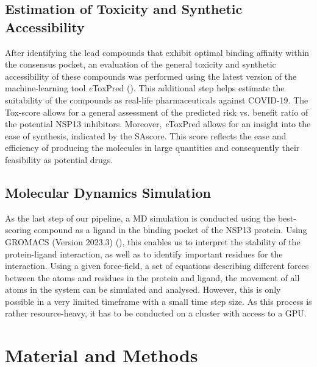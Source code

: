 \documentclass[11pt, letterpaper, titlepage]{article}
\begin{document}
\subsection{Estimation of Toxicity and Synthetic Accessibility}
 After identifying the lead compounds that exhibit optimal binding affinity within the consensus pocket, an evaluation of the general toxicity and synthetic accessibility of these compounds was performed using the latest version of the machine-learning tool \textit{e}ToxPred (\cite{pu2019toxpred}). This additional step helps estimate the suitability of the compounds as real-life pharmaceuticals against COVID-19. The Tox-score allows for a general assessment of the predicted risk vs. benefit ratio of the potential NSP13 inhibitors. Moreover, \textit{e}ToxPred allows for an insight into the ease of synthesis, indicated by the \ac{SAscore}. This score reflects the ease and efficiency of producing the molecules in large quantities and consequently their feasibility as potential drugs. 

\subsection{Molecular Dynamics Simulation}
As the last step of our pipeline, a \ac{MD} simulation is conducted using the best-scoring compound as a ligand in the binding pocket of the NSP13 protein. Using GROMACS (Version 2023.3) (\cite{package_GROMACS}), this enables us to interpret the stability of the protein-ligand interaction, as well as to identify important residues for the interaction. Using a given force-field, a set of equations describing different forces between the atoms and residues in the protein and ligand, the movement of all atoms in the system can be simulated and analysed. However, this is only possible in a very limited timeframe with a small time step size. As this process is rather resource-heavy, it has to be conducted on a cluster with access to a GPU. 


\section{Material and Methods}
\end{document}
